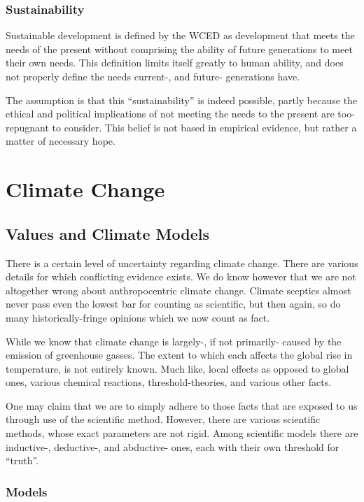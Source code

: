 \documentclass[12pt]{report}
\begin{document}
\section{Sustainability}

Sustainable development is defined by the WCED as development that meets the
needs of the present without comprising the ability of future generations to
meet their own needs. This definition limits itself greatly to human ability,
and does not properly define the needs current-, and future- generations have.

The assumption is that this ``sustainability'' is indeed possible, partly
because the ethical and political implications of not meeting the needs to the
present are too-repugnant to consider. This belief is not based in empirical
evidence, but rather a matter of necessary hope.

\part{Climate Change}
\chapter{Values and Climate Models}

There is a certain level of uncertainty regarding climate change. There are
various details for which conflicting evidence exists. We do know however that
we are not altogether wrong about anthropocentric climate change. Climate
sceptics almost never pass even the lowest bar for counting as scientific, but
then again, so do many historically-fringe opinions which we now count as fact.

While we know that climate change is largely-, if not primarily- caused by the
emission of greenhouse gasses. The extent to which each affects the global rise
in temperature, is not entirely known. Much like, local effects as opposed to
global ones, various chemical reactions, threshold-theories, and various other
facts.

One may claim that we are to simply adhere to those facts that are exposed to us
through use of the scientific method. However, there are various scientific
methods, whose exact parameters are not rigid. Among scientific models there are
inductive-, deductive-, and abductive- ones, each with their own threshold for
``truth''.

\section{Models}
\end{document}
